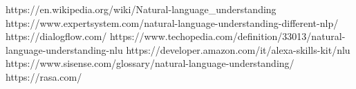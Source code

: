 \begin{thebibliography}{99}

https://en.wikipedia.org/wiki/Natural-language_understanding
https://www.expertsystem.com/natural-language-understanding-different-nlp/
https://dialogflow.com/
https://www.techopedia.com/definition/33013/natural-language-understanding-nlu
https://developer.amazon.com/it/alexa-skills-kit/nlu
https://www.sisense.com/glossary/natural-language-understanding/
https://rasa.com/



\end{thebibliography}
